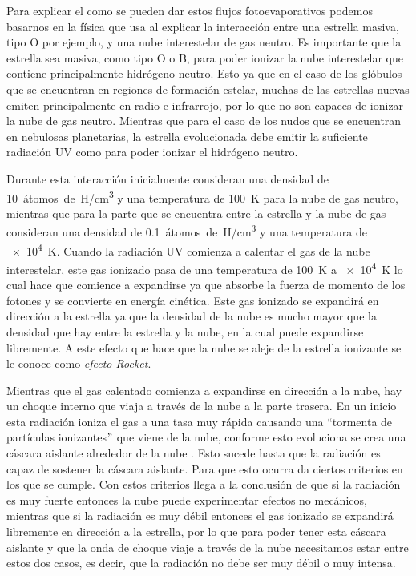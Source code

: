 \documentclass{book}
\begin{document}
Para explicar el como se pueden dar estos flujos fotoevaporativos podemos basarnos en la física que usa \citet{OortySpitzer_1955} al explicar la interacción entre una estrella masiva, tipo O por ejemplo, y una nube interestelar de gas neutro. Es importante que la estrella sea masiva, como tipo O o B, para poder ionizar la nube interestelar que contiene principalmente hidrógeno neutro. Esto ya que en el caso de los glóbulos que se encuentran en regiones de formación estelar, muchas de las estrellas nuevas emiten principalmente en radio e infrarrojo, por lo que no son capaces de ionizar la nube de gas neutro. Mientras que para el caso de los nudos que se encuentran en nebulosas planetarias, la estrella evolucionada debe emitir la suficiente radiación UV como para poder ionizar el hidrógeno neutro.

Durante esta interacción inicialmente consideran una densidad de \SI{10}{átomos de H/cm^{3}} y una temperatura de \SI{100}{K} para la nube de gas neutro, mientras que para la parte que se encuentra entre la estrella y la nube de gas consideran una densidad de \SI{0.1}{átomos de H/cm^{3}} y una temperatura de \SI{e4}{K}. Cuando la radiación UV comienza a calentar el gas de la nube interestelar, este gas ionizado pasa de una temperatura de \SI{100}{K} a \SI{e4}{K} lo cual hace que comience a expandirse ya que absorbe la fuerza de momento de los fotones y se convierte en energía cinética. Este gas ionizado se expandirá en dirección a la estrella ya que la densidad de la nube es mucho mayor que la densidad que hay entre la estrella y la nube, en la cual puede expandirse libremente. A este efecto que hace que la nube se aleje de la estrella ionizante se le conoce como \textit{efecto Rocket}.

Mientras que el gas calentado comienza a expandirse en dirección a la nube, hay un choque interno que viaja a través de la nube a la parte trasera. En un inicio esta radiación ioniza el gas a una tasa muy rápida causando una ``tormenta de partículas ionizantes$"$ que viene de la nube, conforme esto evoluciona se crea una cáscara aislante alrededor de la nube . Esto sucede hasta que la radiación es capaz de sostener la cáscara aislante. Para que esto ocurra \citet{Kahn:1954} da ciertos criterios en los que se cumple. Con estos criterios llega a la conclusión de que si la radiación es muy fuerte entonces la nube puede experimentar efectos no mecánicos, mientras que si la radiación es muy débil entonces el gas ionizado se expandirá libremente en dirección a la estrella, por lo que para poder tener esta cáscara aislante y que la onda de choque viaje a través de la nube necesitamos estar entre estos dos casos, es decir, que la radiación no debe ser muy débil o muy intensa. 
\end{document}

